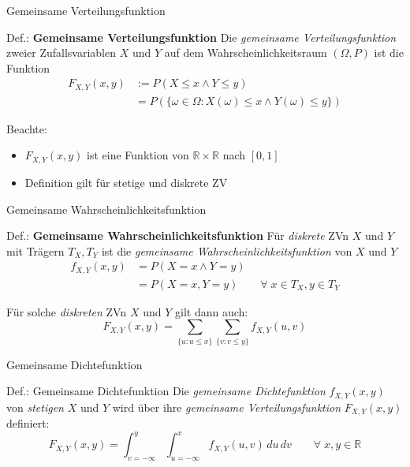 \documentclass[
  10pt,
  ignorenonframetext,
]{beamer}
\providecommand{\tightlist}{%
  \setlength{\itemsep}{0pt}\setlength{\parskip}{0pt}}
\begin{document}
\begin{frame}{Gemeinsame Verteilungsfunktion}
\protect\hypertarget{gemeinsame-verteilungsfunktion}{}
\begin{block}{Def.: \textbf{Gemeinsame Verteilungsfunktion}}
\protect\hypertarget{def.-gemeinsame-verteilungsfunktion}{}
Die \emph{gemeinsame Verteilungsfunktion} zweier Zufallsvariablen \(X\)
und \(Y\) auf dem Wahrscheinlichkeitsraum \((\Omega, P)\) ist die
Funktion \begin{align*}
F_{X,Y}(x,y) &:=  P(X \leq x \land Y \leq y) \\
      &\phantom{}= P(\{\omega \in \Omega: X(\omega) \leq x \land Y(\omega) \leq y\})
\end{align*}
\end{block}

Beachte:

\begin{itemize}
\tightlist
\item
  \(F_{X,Y}(x, y)\) ist eine Funktion von
  \(\mathbb{R} \times \mathbb{R}\) nach \([0, 1]\)
\item
  Definition gilt für stetige und diskrete ZV
\end{itemize}
\end{frame}

\begin{frame}{Gemeinsame Wahrscheinlichkeitsfunktion}
\protect\hypertarget{gemeinsame-wahrscheinlichkeitsfunktion}{}
\begin{block}{Def.: \textbf{Gemeinsame Wahrscheinlichkeitsfunktion}}
\protect\hypertarget{def.-gemeinsame-wahrscheinlichkeitsfunktion}{}
Für \emph{diskrete} ZVn \(X\) und \(Y\) mit Trägern \(T_X, T_Y\) ist die
\emph{gemeinsame Wahrscheinlichkeitsfunktion} von \(X\) und \(Y\)
\begin{align*}
f_{X,Y}(x,y) &= P(X = x \land Y = y) \\
             &= P(X = x, Y = y) \qquad \forall\; x \in T_X, y \in T_Y
\end{align*}
\end{block}

Für solche \emph{diskreten} ZVn \(X\) und \(Y\) gilt dann auch: \[
F_{X,Y}(x,y) = \sum_{ \{u: u \leq x \} } \sum_{\{v: v \leq y \} } f_{X,Y}(u,v) 
\]
\end{frame}

\begin{frame}{Gemeinsame Dichtefunktion}
\protect\hypertarget{gemeinsame-dichtefunktion}{}
\begin{block}{Def.: Gemeinsame Dichtefunktion}
\protect\hypertarget{def.-gemeinsame-dichtefunktion}{}
Die \emph{gemeinsame Dichtefunktion} \(f_{X,Y}(x,y)\) von
\emph{stetigen} \(X\) und \(Y\) wird über ihre \emph{gemeinsame
Verteilungsfunktion} \(F_{X,Y}(x,y)\) definiert: \[
F_{X,Y}(x,y) = \int_{v = -\infty}^y \int_{u = -\infty}^x f_{X,Y}(u,v)\,du\,dv \qquad\forall\; x,y \in \mathbb{R}
\]
\end{block}
\end{frame}
\end{document}
